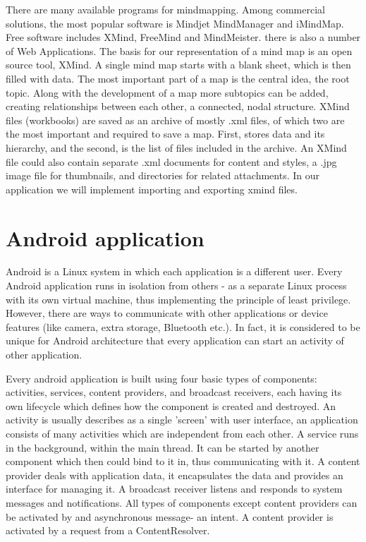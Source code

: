 \documentclass[american]{bsc}
\begin{document}
There are many available programs for mindmapping. Among commercial solutions, the most popular software is Mindjet MindManager and iMindMap. Free software includes XMind, FreeMind and MindMeister. there is also a number of Web Applications. The basis for our representation of a mind map is an open source tool, XMind. A single mind map starts with a blank sheet, which is then filled with data. The most important part of a map is the central idea, the root topic.  Along with the development of a map more subtopics can be added, creating relationships between each other, a connected, nodal structure. XMind files (workbooks) are saved as an archive of mostly .xml files, of which two are the most important and required to save a map. First,  stores data and its hierarchy, and the second,  is the list of files included in the archive. An XMind file could also contain separate .xml documents for content and styles, a .jpg image file for thumbnails, and directories for related attachments. In our application we will implement importing and exporting xmind files.

\section{Android application}
\label{androidsdk}


Android is a Linux system in which each application is a different user. Every Android application runs in isolation from others - as a separate Linux process with its own virtual machine, thus implementing the principle of least privilege. However,  there are ways to communicate with other applications or device features (like camera, extra storage, Bluetooth etc.). In fact, it is considered to be unique for Android architecture that every application can start an activity of other application. 

Every android application is built using four basic types of components: activities, services, content providers, and broadcast receivers, each having its own lifecycle which defines how the component is created and destroyed. An activity is usually describes as a single 'screen' with user interface, an application consists of many activities which are independent from each other. A service runs in the background, within the main thread. It can be started by another component which then could bind to it in, thus communicating with it. A content provider deals with application data, it encapsulates the data and provides an interface for managing it. A broadcast receiver  listens and responds to system messages and notifications. All types of components except content providers can be activated by and asynchronous message- an intent. A content provider is activated by a request from a ContentResolver.
\end{document}
